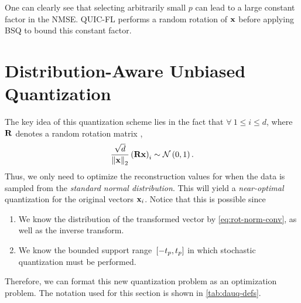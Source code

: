 \documentclass[journal,12pt,twocolumn]{IEEEtran}
\begin{document}
One can clearly see that selecting arbitrarily small \(p\) can lead to a large
constant factor in the NMSE. QUIC-FL performs a random rotation of \(\boldsymbol{\mathbf{x}}\)
before applying BSQ to bound this constant factor.

\section{Distribution-Aware Unbiased Quantization}
\label{sec:dauq}
The key idea of this quantization scheme lies in the fact that \(\forall\ 1 \le
i \le d\), where \(\boldsymbol{\mathbf{R}}\) denotes a random rotation matrix
\cite{vargaftik2021drive},
\begin{equation}
    \frac{\sqrt{d}}{\left\lVert\boldsymbol{\mathbf{x}}\right\rVert_2}\left(\boldsymbol{\mathbf{Rx}}\right)_i \sim \mathcal N\left(0,1\right).
    \label{eq:rot-norm-conv}
\end{equation}
Thus, we only need to optimize the reconstruction values for when the data is
sampled from the \emph{standard normal distribution}. This will yield a
\emph{near-optimal} quantization for the original vectors \(\boldsymbol{\mathbf{x}}_i\). Notice
that this is possible since
\begin{enumerate}
    \item We know the distribution of the transformed vector by
    \eqref{eq:rot-norm-conv}, as well as the inverse transform.
    \item We know the bounded support range \({}\left[-t_p, t_p\right]\) in which
    stochastic quantization must be performed.
\end{enumerate}
Therefore, we can format this new quantization problem as an optimization
problem. The notation used for this section is shown in \autoref{tab:dauq-defs}.
\end{document}
